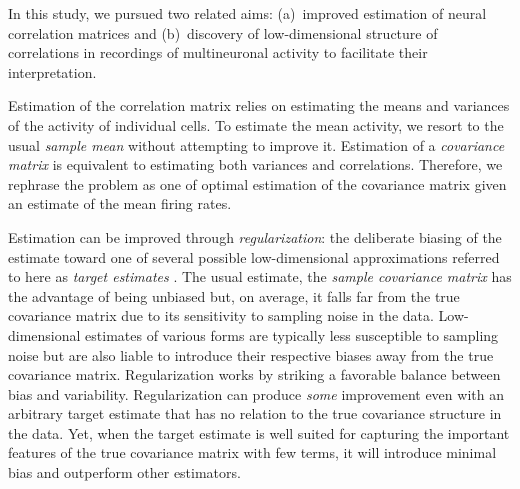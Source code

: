\documentclass[10pt]{article}
\begin{document}
In this study, we pursued two related aims: (a)~improved estimation of neural correlation matrices and (b)~discovery of low-dimensional structure of correlations in recordings of multineuronal activity to facilitate their interpretation.

Estimation of the correlation matrix relies on estimating the means and variances of the activity of individual cells.  To estimate the mean activity, we resort to the usual \emph{sample mean} without attempting to improve it. Estimation of a \emph{covariance matrix} is equivalent to estimating both  variances and correlations. Therefore, we rephrase the problem as one of optimal estimation of the covariance matrix given an estimate of the mean firing rates.

Estimation can be improved through \emph{regularization}: the deliberate biasing of the estimate toward one of several possible low-dimensional approximations referred to here as \emph{target estimates} \cite{Schafer:2005,Bickel:2006}.  The usual estimate, the \emph{sample covariance matrix} has the advantage of being unbiased but, on average, it falls far from the true covariance matrix due to its sensitivity to sampling noise in the data.  Low-dimensional estimates of various forms are typically less susceptible to sampling noise but are also liable to introduce their respective biases away from the true covariance matrix.  Regularization works by striking a favorable balance between bias and variability. Regularization can produce \emph{some} improvement even with an arbitrary target estimate that has no relation to the true covariance structure in the data.  Yet, when the target estimate is well suited for capturing the important features of the true covariance matrix with few terms, it will introduce minimal bias and outperform other estimators. 
\end{document}
